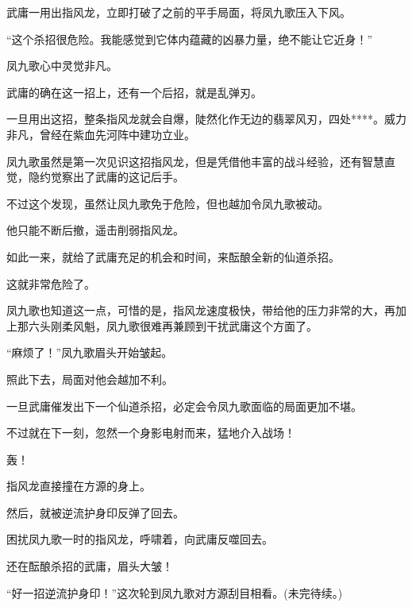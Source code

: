 \begin{this_body}
武庸一用出指风龙，立即打破了之前的平手局面，将凤九歌压入下风。

“这个杀招很危险。我能感觉到它体内蕴藏的凶暴力量，绝不能让它近身！”

凤九歌心中灵觉非凡。

武庸的确在这一招上，还有一个后招，就是乱弹刃。

一旦用出这招，整条指风龙就会自爆，陡然化作无边的翡翠风刃，四处****。威力非凡，曾经在紫血先河阵中建功立业。

凤九歌虽然是第一次见识这招指风龙，但是凭借他丰富的战斗经验，还有智慧直觉，隐约觉察出了武庸的这记后手。

不过这个发现，虽然让凤九歌免于危险，但也越加令凤九歌被动。

他只能不断后撤，遥击削弱指风龙。

如此一来，就给了武庸充足的机会和时间，来酝酿全新的仙道杀招。

这就非常危险了。

凤九歌也知道这一点，可惜的是，指风龙速度极快，带给他的压力非常的大，再加上那六头刚柔风魁，凤九歌很难再兼顾到干扰武庸这个方面了。

“麻烦了！”凤九歌眉头开始皱起。

照此下去，局面对他会越加不利。

一旦武庸催发出下一个仙道杀招，必定会令凤九歌面临的局面更加不堪。

不过就在下一刻，忽然一个身影电射而来，猛地介入战场！

轰！

指风龙直接撞在方源的身上。

然后，就被逆流护身印反弹了回去。

困扰凤九歌一时的指风龙，呼啸着，向武庸反噬回去。

还在酝酿杀招的武庸，眉头大皱！

“好一招逆流护身印！”这次轮到凤九歌对方源刮目相看。(未完待续。)

\end{this_body}

